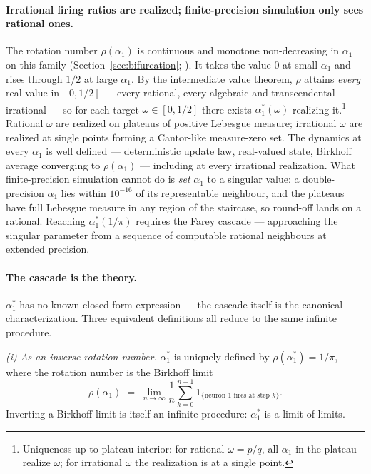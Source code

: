 \paragraph{Irrational firing ratios are realized; finite-precision simulation only sees rational ones.}
The rotation number $\rho(\alpha_1)$ is continuous and monotone non-decreasing in $\alpha_1$ on this family (Section~\ref{sec:bifurcation}; \citealp{herman1979conjugaison}). It takes the value $0$ at small $\alpha_1$ and rises through $1/2$ at large $\alpha_1$. By the intermediate value theorem, $\rho$ attains \emph{every} real value in $[0,1/2]$ --- every rational, every algebraic and transcendental irrational --- so for each target $\omega\in[0,1/2]$ there exists $\alpha_1^*(\omega)$ realizing it.\footnote{Uniqueness up to plateau interior: for rational $\omega=p/q$, all $\alpha_1$ in the plateau realize $\omega$; for irrational $\omega$ the realization is at a single point.} Rational $\omega$ are realized on plateaus of positive Lebesgue measure; irrational $\omega$ are realized at single points forming a Cantor-like measure-zero set. The dynamics at every $\alpha_1$ is well defined --- deterministic update law, real-valued state, Birkhoff average converging to $\rho(\alpha_1)$ --- including at every irrational realization. What finite-precision simulation cannot do is \emph{set} $\alpha_1$ to a singular value: a double-precision $\alpha_1$ lies within $10^{-16}$ of its representable neighbour, and the plateaus have full Lebesgue measure in any region of the staircase, so round-off lands on a rational. Reaching $\alpha_1^*(1/\pi)$ requires the Farey cascade --- approaching the singular parameter from a sequence of computable rational neighbours at extended precision.

\paragraph{The cascade is the theory.}
$\alpha_1^*$ has no known closed-form expression --- the cascade itself is the canonical characterization. Three equivalent definitions all reduce to the same infinite procedure.

\emph{(i) As an inverse rotation number.} $\alpha_1^*$ is uniquely defined by $\rho(\alpha_1^*) = 1/\pi$, where the rotation number is the Birkhoff limit
\[
\rho(\alpha_1) \;=\; \lim_{n\to\infty} \frac{1}{n}\sum_{k=0}^{n-1} \mathbf{1}_{\{\text{neuron 1 fires at step } k\}}.
\]
Inverting a Birkhoff limit is itself an infinite procedure: $\alpha_1^*$ is a limit of limits.

